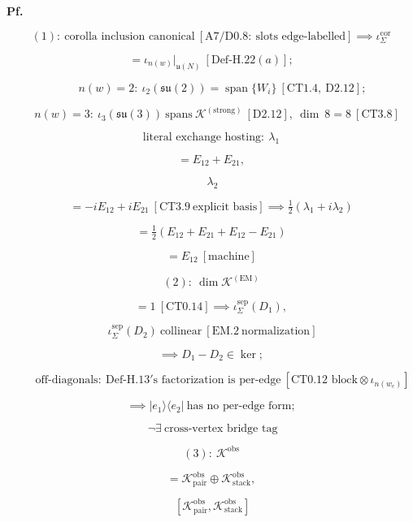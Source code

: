\begin{theorem}
\textbf{Pf.}

\[
(1):\ \text{corolla inclusion canonical}\ [\mathrm{A7}/\mathrm{D0.8}:\ \text{slots edge-labelled}]\implies\iota_\Sigma^{\mathrm{cor}}
\]

\[
= \iota_{n(w)}|_{\mathfrak u(N)}\ [\mathrm{Def\text{-}H.22}(a)];
\]

\[
\qquad n(w)=2:\ \iota_2(\mathfrak{su}(2))=\operatorname{span}\{W_i\}\ [\mathrm{CT1.4},\ \mathrm{D2.12}];
\]

\[
\quad n(w)=3:\ \iota_3(\mathfrak{su}(3))\ \text{spans}\ \mathcal K^{(\mathrm{strong})}\ [\mathrm{D2.12}],\ \dim\ 8=8\ [\mathrm{CT3.8}]
\]

\[
\text{literal exchange hosting}:\ \lambda_1
\]

\[
= E_{12}+E_{21},
\]

\[
\ \lambda_2
\]

\[
= -iE_{12}+iE_{21}\ [\mathrm{CT3.9}\ \text{explicit basis}]\implies\tfrac12(\lambda_1+i\lambda_2)
\]

\[
= \tfrac12(E_{12}+E_{21}+E_{12}-E_{21})
\]

\[
= E_{12}\ [\text{machine}]
\]

\[
(2):\ \dim\mathcal K^{(\mathrm{EM})}
\]

\[
= 1\ [\mathrm{CT0.14}]\implies\iota_\Sigma^{\mathrm{sep}}(D_1),
\]

\[
\ \iota_\Sigma^{\mathrm{sep}}(D_2)\ \text{collinear}\ [\mathrm{EM.2}\ \text{normalization}]
\]

\[
\implies D_1-D_2\in\ker;
\]

\[
\qquad \text{off-diagonals}:\ \mathrm{Def\text{-}H.13}'\text{s factorization is per-edge}\ [\text{CT0.12 block}\otimes\iota_{n(w_e)}]
\]

\[
\implies |e_1\rangle\langle e_2|\ \text{has no per-edge form};
\]

\[
\ \neg\exists\ \text{cross-vertex bridge tag}
\]

\[
(3):\ \mathcal K^{\mathrm{obs}}
\]

\[
= \mathcal K_{\mathrm{pair}}^{\mathrm{obs}}\oplus\mathcal K_{\mathrm{stack}}^{\mathrm{obs}},
\]

\[
\ [\mathcal K_{\mathrm{pair}}^{\mathrm{obs}},\mathcal K_{\mathrm{stack}}^{\mathrm{obs}}]
\]


\end{theorem}

